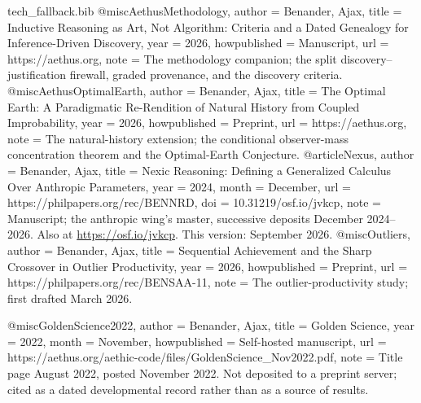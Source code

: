 \begin{filecontents}[overwrite]{tech_fallback.bib}
@misc{AethusMethodology,
  author       = {Benander, Ajax},
  title        = {Inductive Reasoning as Art, Not Algorithm: Criteria and a Dated Genealogy for Inference-Driven Discovery},
  year         = {2026},
  howpublished = {Manuscript},
  url          = {https://aethus.org},
  note         = {The methodology companion; the split discovery--justification
                  firewall, graded provenance, and the discovery criteria.}
}
@misc{AethusOptimalEarth,
  author       = {Benander, Ajax},
  title        = {The Optimal Earth: A Paradigmatic Re-Rendition of Natural History from Coupled Improbability},
  year         = {2026},
  howpublished = {Preprint},
  url          = {https://aethus.org},
  note         = {The natural-history extension; the conditional observer-mass
                  concentration theorem and the Optimal-Earth Conjecture.}
}
@article{Nexus,
  author      = {Benander, Ajax},
  title       = {Nexic Reasoning: Defining a Generalized Calculus Over Anthropic Parameters},
  year        = {2024},
  month       = {December},
  url         = {https://philpapers.org/rec/BENNRD},
  doi         = {10.31219/osf.io/jvkcp},
  note        = {Manuscript; the anthropic wing's master, successive deposits
                 December 2024--2026. Also at \url{https://osf.io/jvkcp}.
                 This version: September 2026.}
}
@misc{Outliers,
  author       = {Benander, Ajax},
  title        = {Sequential Achievement and the Sharp Crossover in Outlier Productivity},
  year         = {2026},
  howpublished = {Preprint},
  url          = {https://philpapers.org/rec/BENSAA-11},
  note         = {The outlier-productivity study; first drafted March 2026.}
}

@misc{GoldenScience2022,
  author       = {Benander, Ajax},
  title        = {Golden Science},
  year         = {2022},
  month        = {November},
  howpublished = {Self-hosted manuscript},
  url          = {https://aethus.org/aethic-code/files/GoldenScience_Nov2022.pdf},
  note         = {Title page August 2022, posted November 2022. Not deposited to a
                  preprint server; cited as a dated developmental record rather than
                  as a source of results.}
}
\end{filecontents}
